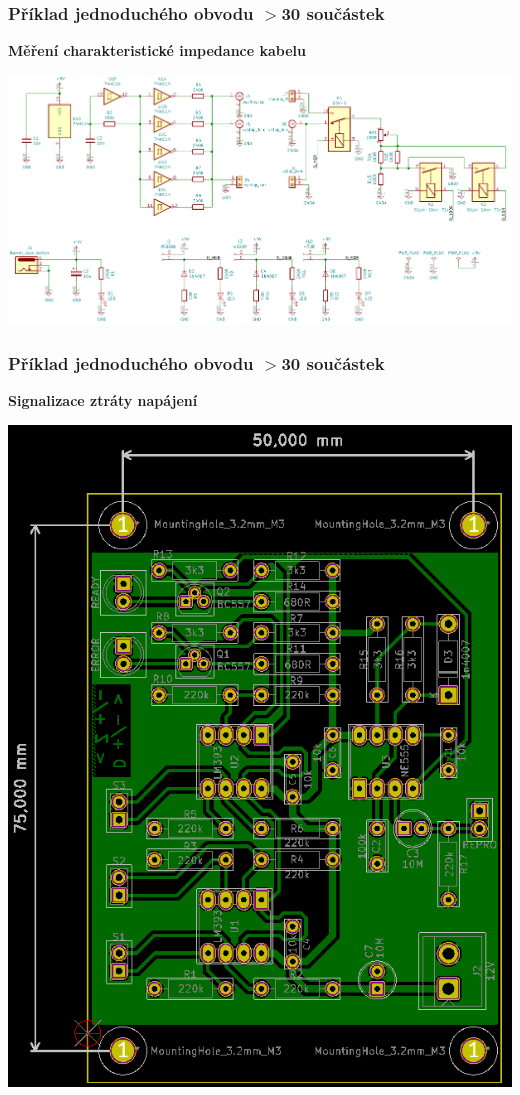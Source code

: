 \documentclass{beamer}
\begin{document}
	\begin{frame}
    \frametitle{Příklad jednoduchého obvodu $>$30 součástek}
		\textbf{Měření charakteristické impedance kabelu}
    \begin{center}
      \includegraphics[scale=0.26]{obr/eo_impSch.png}
    \end{center}
	
	\end{frame}
	\begin{frame}
    \frametitle{Příklad jednoduchého obvodu $>$30 součástek}
		\textbf{Signalizace ztráty napájení}
    \begin{center}
      \includegraphics[scale=0.26]{obr/eo_detBrd.png}
    \end{center}
	
	\end{frame}
\end{document}
